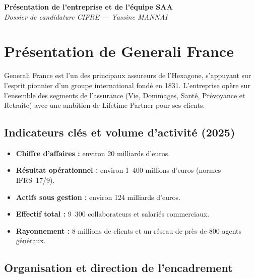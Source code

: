 \documentclass[10pt,a4paper]{article}
\begin{document}
\thispagestyle{fancy}

\begin{center}
  {\Large\bfseries Présentation de l'entreprise et de l'équipe SAA}\\[6pt]
  {\normalsize\itshape Dossier de candidature CIFRE --- Yassine MANNAI}
\end{center}

\vspace{0.4cm}

\section{Présentation de Generali France}

Generali France est l'un des principaux assureurs de l'Hexagone, s'appuyant
sur l'esprit pionnier d'un groupe international fondé en 1831.  L'entreprise
opère sur l'ensemble des segments de l'assurance (Vie, Dommages, Santé,
Prévoyance et Retraite) avec une ambition de \og{}Lifetime Partner\fg{} pour
ses clients.

\subsection{Indicateurs clés et volume d'activité (2025)}
\begin{itemize}[leftmargin=1.6em,itemsep=1pt]
  \item \textbf{Chiffre d'affaires :} environ 20 milliards d'euros.
  \item \textbf{Résultat opérationnel :} environ 1~400 millions d'euros (normes IFRS~17/9).
  \item \textbf{Actifs sous gestion :} environ 124 milliards d'euros.
  \item \textbf{Effectif total :} 9~300 collaborateurs et salariés commerciaux.
  \item \textbf{Rayonnement :} 8 millions de clients et un réseau de près de 800 agents généraux.
\end{itemize}

\subsection{Organisation et direction de l'encadrement}
\end{document}

